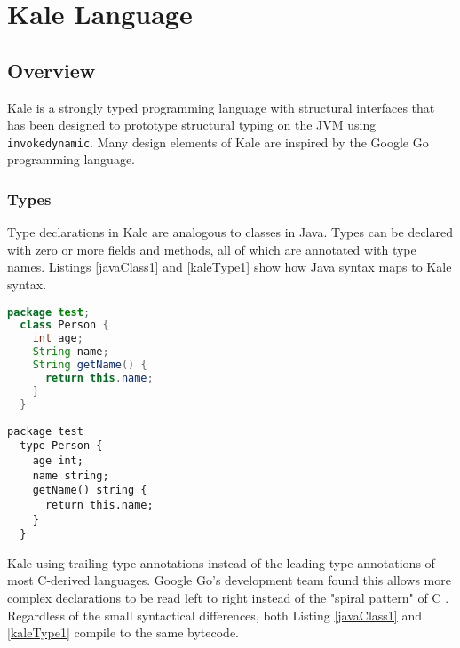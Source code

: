 \chapter{Kale Language}
\label{chapter:Kale}
\lhead{ \leftmark }

\section{Overview}

Kale is a strongly typed programming language with structural interfaces that has been designed to prototype structural typing on the JVM using \texttt{invokedynamic}.  Many design elements of Kale are inspired by the Google Go \cite{golang-spec} programming language.

\subsection{Types}

Type declarations in Kale are analogous to classes in Java.  Types can be declared with zero or more fields and methods, all of which are annotated with type names.  Listings \ref{javaClass1} and \ref{kaleType1} show how Java syntax maps to Kale syntax.

\begin{minipage}[t]{0.45\textwidth}
\begin{lstlisting}[language=Java,caption=A Java code example,label=javaClass1]
  package test;
  class Person {
    int age;
    String name;
    String getName() {
      return this.name;
    }
  }
\end{lstlisting}
\end{minipage}
\hspace{0.5cm}
\begin{minipage}[t]{0.45\textwidth}
\begin{lstlisting}[language=Kale,caption=A Kale code example,label=kaleType1]
  package test
  type Person {
    age int;
    name string;
    getName() string {
      return this.name;
    }
  }
\end{lstlisting}
\end{minipage}

Kale using trailing type annotations instead of the leading type annotations of most C-derived languages.  Google Go's development team found this allows more complex declarations to be read left to right \cite{golang-decl-syntax} instead of the "spiral pattern" of C \cite{c-spiral-decl}.  Regardless of the small syntactical differences, both Listing \ref{javaClass1} and \ref{kaleType1} compile to the same bytecode.

